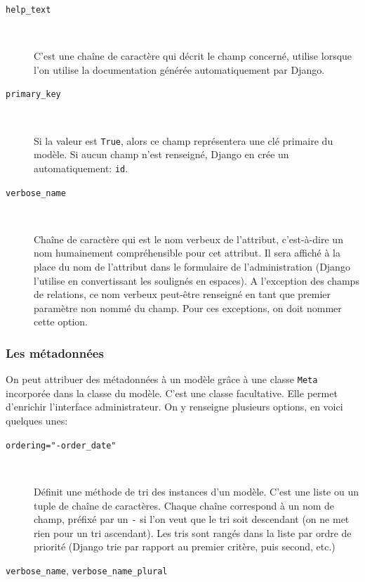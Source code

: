 \documentclass[a4paper, 10pt]{article}
\begin{document}
{\begin{description}
    \item[\texttt{help_text}]~

    C'est une chaîne de caractère qui décrit le champ concerné, utilise lorsque l'on utilise la documentation générée automatiquement par Django.

    \item[\texttt{primary_key}]~

    Si la valeur est \texttt{True}, alors ce champ représentera une clé primaire du modèle. Si aucun champ n'est renseigné, Django en crée un automatiquement: \texttt{id}.

    \item[\texttt{verbose_name}]~

    Chaîne de caractère qui est le \og nom verbeux \fg{} de l'attribut, c'est-à-dire un nom humainement compréhensible pour cet attribut. Il sera affiché à la place du nom de l'attribut dans le formulaire de l'administration (Django l'utilise en convertissant les soulignés en espaces). A l'exception des champs de relations, ce nom verbeux peut-être renseigné en tant que premier paramètre non nommé du champ. Pour ces exceptions, on doit nommer cette option.
\end{description}

\subsubsection{Les métadonnées}
On  peut attribuer des métadonnées à un modèle grâce à une classe \texttt{Meta} incorporée dans la classe du modèle. C'est une classe facultative. Elle permet d'enrichir l'interface administrateur. On y renseigne plusieurs options, en voici quelques unes:
\begin{description}
    \item[\texttt{ordering="-order_date"}]~

    Définit une méthode de tri des instances d'un modèle. C'est une liste ou un tuple de chaîne de caractères. Chaque chaîne correspond à un nom de champ, préfixé par un \texttt{-} si l'on veut que le tri soit descendant (on ne met rien pour un tri ascendant). Les tris sont rangés dans la liste par ordre de priorité (Django trie par rapport au premier critère, puis second, etc.)

    \item[\texttt{verbose_name}, \texttt{verbose_name_plural}]~


\end{description}}
\end{document}
